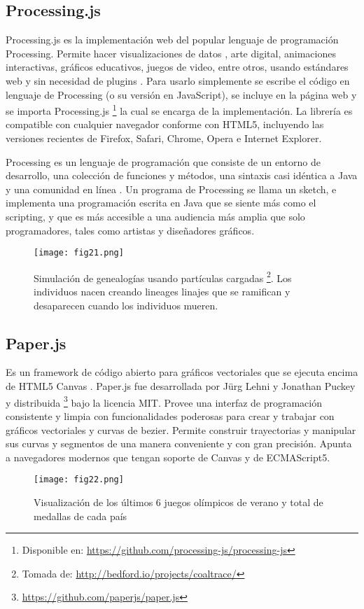 \subsection{Processing.js}

Processing.js es la implementación web del popular lenguaje de programación Processing. Permite hacer visualizaciones de datos , arte digital, animaciones interactivas, gráficos educativos, juegos de video, entre otros, usando estándares web y sin necesidad de plugins \cite{ProcJS}. Para usarlo simplemente se escribe el código en lenguaje de Processing (o su versión en JavaScript), se incluye en la página web y se importa Processing.js \footnote{Disponible en: \url{https://github.com/processing-js/processing-js}} la cual se encarga de la implementación. La librería es compatible con cualquier navegador conforme con HTML5, incluyendo las versiones recientes de Firefox, Safari, Chrome, Opera e Internet Explorer.

Processing es un lenguaje de programación que consiste de un entorno de desarrollo, una colección de funciones y métodos, una sintaxis casi idéntica a Java y una comunidad en línea \cite{Fry07}. Un programa de Processing se llama un sketch, e implementa una programación escrita en Java que se siente más como el scripting, y que es más accesible a una audiencia más amplia que solo programadores, tales como artistas y diseñadores gráficos.

\begin{figure}[htp]
  \centering
  \texttt{[image: fig21.png]}
  \caption[Simulación de genealogías usando partículas cargadas]{Simulación de genealogías usando partículas cargadas \footnote{Tomada de: \url{http://bedford.io/projects/coaltrace/}}. Los individuos nacen creando lineages linajes que se ramifican y desaparecen cuando los individuos mueren.}
  \label{fig:fig21}
\end{figure}

\subsection{Paper.js}

Es un framework de código abierto para gráficos vectoriales que se ejecuta encima de HTML5 Canvas \cite{PaperJS}. Paper.js fue desarrollada por Jürg Lehni y Jonathan Puckey y distribuida \footnote{\url{https://github.com/paperjs/paper.js}} bajo la licencia MIT. Provee una interfaz de programación consistente y limpia con funcionalidades poderosas para crear y trabajar con gráficos vectoriales y curvas de bezier. Permite construir trayectorias y manipular sus curvas y segmentos de una manera conveniente y con gran precisión. Apunta a navegadores modernos que tengan soporte de Canvas y de ECMAScript5.

\begin{figure}[htp]
  \centering
  \texttt{[image: fig22.png]}
  \caption[Visualización de medallas en las Olimpiadas usando Paper.js]{Visualización de los últimos 6 juegos olímpicos de verano y total de medallas de cada país \protect\footnotemark}
  \label{fig:fig22}
\end{figure}

